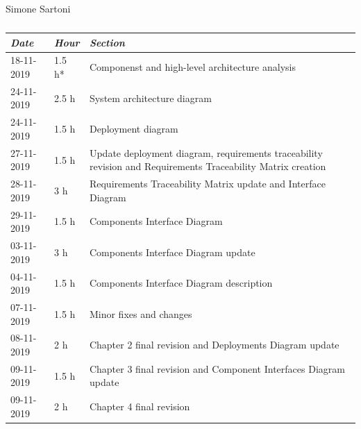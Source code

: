\documentclass[a4paper]{report}
\begin{document}
\vspace*{1 cm}
\begin{table}[H]
\centering
Simone Sartoni \\
\begin{tabular}{p{2cm}p{1.5cm}p{7cm}}
\toprule
\textit{Date} & \textit{Hour} & \textit{Section} \\ \midrule
18-11-2019 & 1.5  h* & Componenst and high-level architecture analysis \\ \midrule
24-11-2019 & 2.5 h &  System architecture diagram \\ \midrule
24-11-2019 & 1.5 h &  Deployment diagram\\ \midrule
27-11-2019 & 1.5 h & Update deployment diagram, requirements traceability revision and Requirements Traceability Matrix creation \\ \midrule
28-11-2019 & 3 h & Requirements Traceability Matrix update and Interface Diagram \\ \midrule
29-11-2019 & 1.5 h & Components Interface Diagram \\ \midrule
03-11-2019 & 3 h & Components Interface Diagram update \\ \midrule
04-11-2019 & 1.5 h & Components Interface Diagram description \\ \midrule
07-11-2019 & 1.5 h & Minor fixes and changes \\ \midrule
08-11-2019 & 2 h & Chapter 2 final revision and Deployments Diagram update \\ \midrule
09-11-2019 & 1.5 h & Chapter 3 final revision and Component Interfaces Diagram update \\ \midrule
09-11-2019 & 2 h & Chapter 4 final revision\\ \midrule

\bottomrule
\end{tabular}
\caption[Simone Sartoni's effort table]{}
\end{table}
\vspace*{1 cm}
\end{document}
